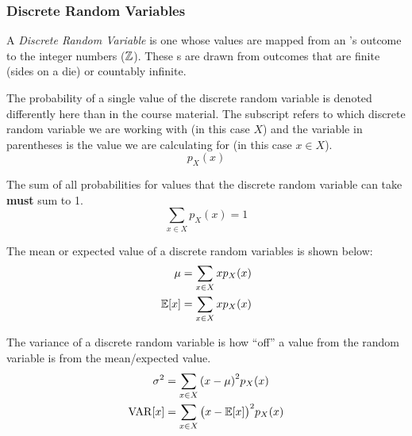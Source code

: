 \subsubsection{Discrete Random Variables}\label{subsubsec:Discrete_Random_Variables}
\begin{definition}\label{def:Discrete_Random_Variable}
  A \emph{Discrete Random Variable} is one whose values are mapped from an 's outcome to the integer numbers ($\operatorname{\mathbb{Z}}$).
  These s are drawn from outcomes that are finite (sides on a die) or countably infinite.

  The probability of a single value of the discrete random variable is denoted differently here than in the course material.
  The subscript refers to which discrete random variable we are working with (in this case $X$) and the variable in parentheses is the value we are calculating for (in this case $x \in X$).
  \begin{equation}\label{eq:Discrete_Random_Variable-Single_Value}
    p_{X}(x)
  \end{equation}

  The sum of all probabilities for values that the discrete random variable can take \textbf{must} sum to 1.
  \begin{equation}\label{eq:Discrete_Random_Variable-Sum_to_One}
    \sum\limits_{x \in X} p_{X}(x) = 1
  \end{equation}

  The mean or expected value of a discrete random variables is shown below:
  \begin{equation}\label{eq:Discrete_Random_Variable-Expected_Value}
    \begin{aligned}
      \mu = \sum\limits_{x \in X} x p_{X}(x) \\
      \operatorname{\operatorname{\mathbb{E}}}[x] = \sum\limits_{x \in X} x p_{X}(x) \\
    \end{aligned}
  \end{equation}

  The variance of a discrete random variable is how ``off'' a value from the random variable is from the mean/expected value.
  \begin{equation}\label{eq:Discrete_Random_Variable-Variance}
    \begin{aligned}
      \sigma^{2} &= \sum\limits_{x \in X} {\left( x - \mu \right)}^{2} p_{X}(x) \\
      \operatorname{\operatorname{VAR}}[x] &= \sum\limits_{x \in X} {\bigl( x - \operatorname{\operatorname{\mathbb{E}}}[x] \bigr)}^{2} p_{X}(x) \\
    \end{aligned}
  \end{equation}


\end{definition}

